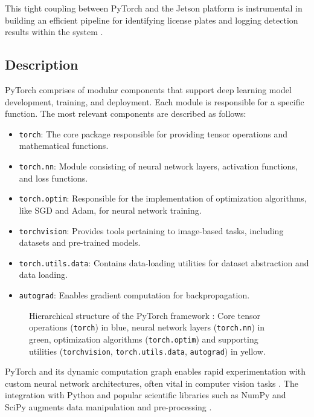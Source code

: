 This tight coupling between PyTorch and the Jetson platform is instrumental in building an efficient pipeline for identifying license plates and logging detection results within the system \cite{jetsonpytorch}.

\subsection{Description}

PyTorch comprises of modular components that support deep learning model development, training, and deployment. Each module is responsible for a specific function. The most relevant components are described as follows:

\begin{itemize}
	\item \texttt{torch}: The core package responsible for providing tensor operations and mathematical functions.
	\item \texttt{torch.nn}: Module consisting of neural network layers, activation functions, and loss functions.
	\item \texttt{torch.optim}: Responsible for the implementation of optimization algorithms, like SGD and Adam, for neural network training.
	\item \texttt{torchvision}: Provides tools pertaining to image-based tasks, including datasets and pre-trained models.
	\item \texttt{torch.utils.data}: Contains data-loading utilities for dataset abstraction and data loading.
	\item \texttt{autograd}: Enables gradient computation for backpropagation.
\end{itemize}

\begin{figure}[htbp]
	\centering
	
	\captionsetup{font=small}
	\caption{Hierarchical structure of the PyTorch framework : Core tensor operations (\texttt{torch}) in blue, neural network layers (\texttt{torch.nn}) in green, optimization algorithms (\texttt{torch.optim}) and supporting utilities (\texttt{torchvision}, \texttt{torch.utils.data}, \texttt{autograd}) in yellow.}
	\label{fig:pytorch_structure}
\end{figure}


PyTorch and its dynamic computation graph enables rapid experimentation with custom neural network architectures, often vital in computer vision tasks \cite{paszke2019pytorch}. The integration with Python and popular scientific libraries such as NumPy and SciPy augments data manipulation and pre-processing \cite{goodfellow2016deep}.

